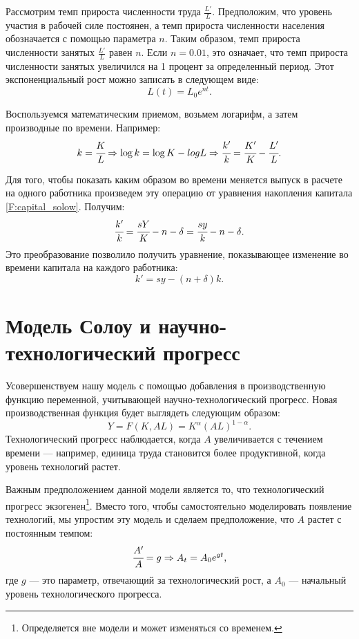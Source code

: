 Рассмотрим темп прироста численности труда $\frac{L'}{L}$.
Предположим, что уровень участия в рабочей силе постоянен, а темп прироста численности населения обозначается с помощью параметра $n$.
Таким образом, темп прироста численности занятых $\frac{L'}{L}$ равен $n$.
Если $n = 0.01$, это означает, что темп прироста численности занятых увеличился на 1 процент за определенный период.
Этот экспоненциальный рост можно записать в следующем виде:
\begin{equation*}
	L(t) = L_{0}e^{nt}\text{.}
\end{equation*}

Воспользуемся математическим приемом, возьмем логарифм, а затем производные по времени.
Например:
\begin{equation*}
	k = \cfrac{K}{L}\Rightarrow \log{k}=\log{K} - log{L} \Rightarrow \cfrac{k'}{k} = \cfrac{K'}{K} - \cfrac{L'}{L}\text{.}
\end{equation*}

Для того, чтобы показать каким образом во времени меняется выпуск в расчете на одного работника произведем эту операцию от уравнения накопления капитала \ref{F:capital_solow}.
Получим:
\begin{equation*}
\cfrac{k'}{k} = \cfrac{sY}{K} - n - \delta = \cfrac{sy}{k} - n - \delta\text{.}
\end{equation*}
Это преобразование позволило получить уравнение, показывающее изменение во времени капитала на каждого работника:
\begin{equation*}
k'=sy-(n + \delta)k\text{.}
\end{equation*}

\section{Модель Солоу и научно-технологический прогресс}

Усовершенствуем нашу модель с помощью добавления в производственную функцию переменной, учитывающей научно-технологический прогресс.
Новая производственная функция будет выглядеть следующим образом:
\begin{equation}
	Y=F(K,AL)=K^{\alpha}(AL)^{1 - \alpha}\text{.}
\label{F:Cob_dogl_tech}
\end{equation}
Технологический прогресс наблюдается, когда $A$ увеличивается с течением времени --- например, единица труда становится более продуктивной, когда уровень технологий растет.

Важным предположением данной модели является то, что технологический прогресс экзогенен\footnote{Определяется вне модели и может изменяться со временем.}.
Вместо того, чтобы самостоятельно моделировать появление технологий, мы упростим эту модель и сделаем предположение, что $A$ растет с постоянным темпом:
\begin{equation*}
	\cfrac{A'}{A} = g \Rightarrow A_{t} = A_{0} e^{gt}\text{,}
\end{equation*}
где $g$ --- это параметр, отвечающий за технологический рост, а $A_0$ --- начальный уровень технологического прогресса.

